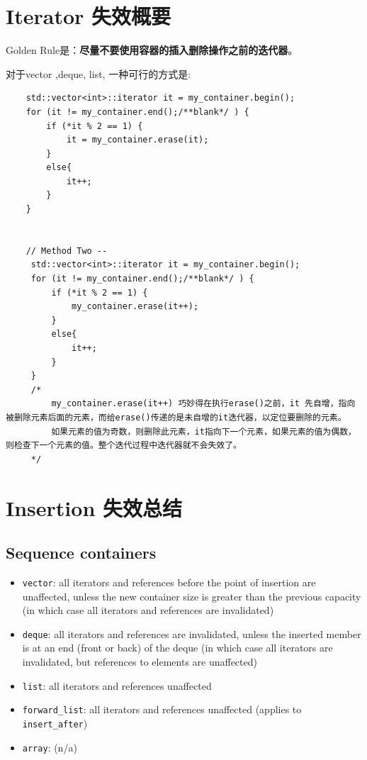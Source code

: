 \documentclass[UTF8,a4paper,12pt]{ctexbook}
\begin{document}
	\section{Iterator 失效概要}
		Golden Rule是：\textbf{尽量不要使用容器的插入删除操作之前的迭代器}。
		
		对于vector ,deque, list, 一种可行的方式是:
			\begin{lstlisting}
	std::vector<int>::iterator it = my_container.begin();  
	for (it != my_container.end();/**blank*/ ) {  
		if (*it % 2 == 1) {  
			it = my_container.erase(it);  
		}  
		else{  
			it++;  
		}  
	}  			
	
	
	// Method Two --
	 std::vector<int>::iterator it = my_container.begin();  
	 for (it != my_container.end();/**blank*/ ) {  
		 if (*it % 2 == 1) {  
			 my_container.erase(it++);  
		 }  
		 else{  
			 it++;  
		 }  
	 }  
	 /*
		 my_container.erase(it++) 巧妙得在执行erase()之前，it 先自增，指向被删除元素后面的元素，而给erase()传递的是未自增的it迭代器，以定位要删除的元素。
		 如果元素的值为奇数，则删除此元素，it指向下一个元素，如果元素的值为偶数，则检查下一个元素的值。整个迭代过程中迭代器就不会失效了。
	 */
			\end{lstlisting}
			
	\section{Insertion 失效总结}
		\subsection{Sequence containers}
			\begin{itemize}
				\item \verb|vector|: all iterators and references before the point of insertion are unaffected, unless the new container size is greater than the previous capacity (in which case all iterators and references are invalidated)
				\item \verb|deque|: all iterators and references are invalidated, unless the inserted member is at an end (front or back) of the deque (in which case all iterators are invalidated, but references to elements are unaffected)
				\item \verb|list|: all iterators and references unaffected 
				\item \verb|forward_list|: all iterators and references unaffected (applies to \verb|insert_after|) 
				\item \verb|array|: (n/a)
			\end{itemize}
\end{document}
